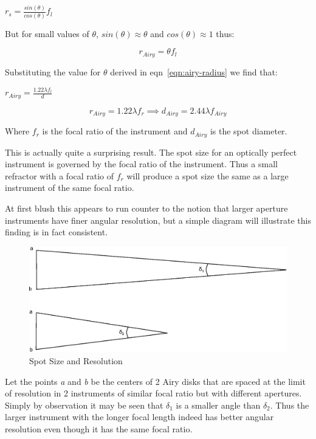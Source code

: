 \documentclass[11pt]{article}
\begin{document}
\LARGE
$r_{s}=\frac{sin(\theta)}{cos(\theta)} f_{l}$

\large
But for small values of $\theta$, $sin(\theta)\approx\theta$ and $cos(\theta)\approx 1$ thus:

\Large
\begin{equation}
\label{eqn:spot-startpoint}
r_{Airy}=\theta f_{l}
\end{equation}

\large
Substituting the value for $\theta$ derived in eqn~\ref{eqn:airy-radius} we find that:

\LARGE
$r_{Airy}=\frac{1.22\lambda f_{l}}{d} $

\Large
\begin{equation}
\label{eqn:spot-diameter}
r_{Airy}=1.22\lambda f_{r} \implies d_{Airy}=2.44\lambda f_{Airy}
\end{equation}

\large
Where $f_{r}$ is the focal ratio of the instrument and $d_{Airy}$ is the spot diameter.

This is actually quite a surprising result.  The spot size for an optically perfect instrument is governed by the focal ratio of the instrument.  Thus a small refractor with a focal ratio of $f_{r}$ will produce a spot size the same as a large instrument of the same focal ratio.

At first blush this appears to run counter to the notion that larger aperture instruments have finer angular resolution, but a simple diagram will illustrate this finding is in fact consistent.

\begin{figure}[htb]
	\begin{center}
		\includegraphics[scale=0.7]{./images/focal-ratio-resolution.eps}
		\caption{Spot Size and Resolution}
		\label{fig:spot_resolution}
	\end{center}
\end{figure}


Let the points {\em a} and {\em b} be the centers of 2 Airy disks that are spaced at the limit of resolution in 2 instruments of similar focal ratio but with different apertures.  Simply by observation it may be seen that $\delta_{1}$ is a smaller angle than $\delta_{2}$.  Thus the larger instrument with the longer focal length indeed has better angular resolution even though it has the same focal ratio.
\end{document}
